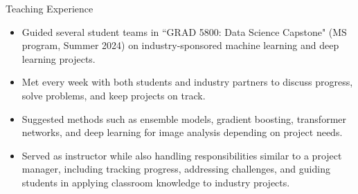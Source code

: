 \begin{rSection}{Teaching Experience}
\begin{itemize}
    \itemsep -3pt {}
    \item Guided several student teams in ``GRAD 5800: Data Science Capstone" (MS program, Summer 2024) on industry-sponsored machine learning and deep learning projects.  
    \item Met every week with both students and industry partners to discuss progress, solve problems, and keep projects on track.  
    \item Suggested methods such as ensemble models, gradient boosting, transformer networks, and deep learning for image analysis depending on project needs.  
    \item Served as instructor while also handling responsibilities similar to a project manager, including tracking progress, addressing challenges, and guiding students in applying classroom knowledge to industry projects.  
\end{itemize}


\end{rSection}
